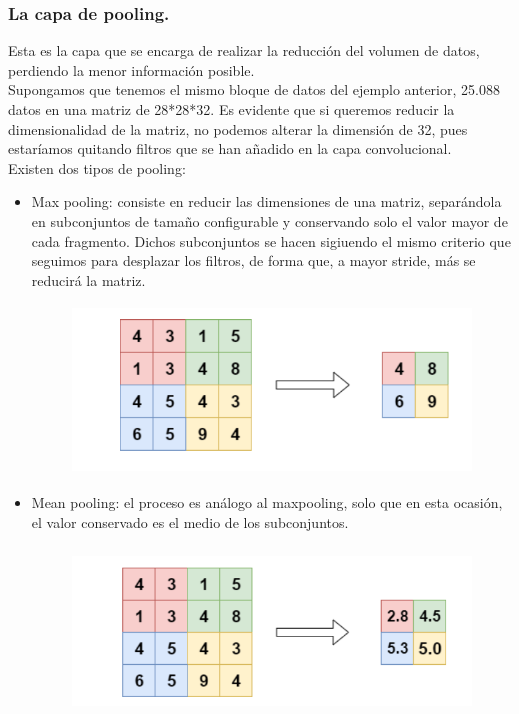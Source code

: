 \documentclass[a4paper,10pt]{article}
\begin{document}
\subsubsection{La capa de pooling.}
Esta es la capa que se encarga de realizar la reducción del volumen de datos, perdiendo la menor información posible.\\ Supongamos que tenemos el mismo bloque de datos del ejemplo anterior, 25.088 datos en una matriz de 28*28*32. Es evidente que si queremos reducir la dimensionalidad de la matriz, no podemos alterar la dimensión de 32, pues estaríamos quitando filtros que se han añadido en la capa convolucional.\\
Existen dos tipos de pooling:
\begin{itemize}
\item Max pooling: consiste en reducir las dimensiones de una matriz, separándola en subconjuntos de tamaño configurable y conservando solo el valor mayor de cada fragmento. Dichos subconjuntos se hacen sigiuendo el mismo criterio que seguimos para desplazar los filtros, de forma que, a mayor stride, más se reducirá la matriz.
\begin{figure}[H]
\centering
\includegraphics[width=11.0cm, height=4.5cm]{maxpool.png}
\end{figure}
\item Mean pooling: el proceso es análogo al maxpooling, solo que en esta ocasión, el valor conservado es el medio de los subconjuntos.
\begin{figure}[H]
\centering
\includegraphics[width=11.0cm, height=4.5cm]{meanpool.png}
\end{figure}
\end{itemize}
\end{document}
